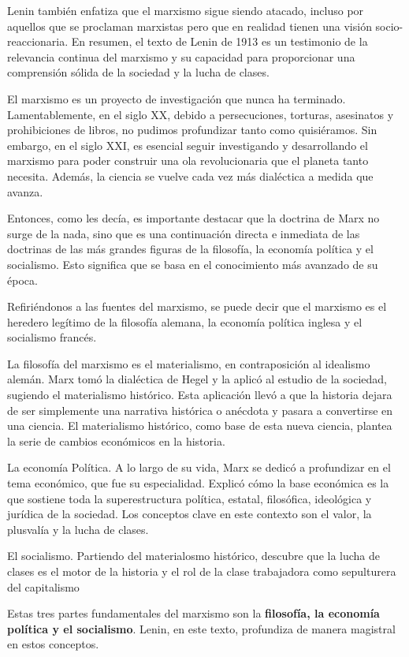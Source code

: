 \documentclass[
  a4paper,
]{article}
\begin{document}
Lenin también enfatiza que el marxismo sigue siendo atacado, incluso por
aquellos que se proclaman marxistas pero que en realidad tienen una
visión socio-reaccionaria. En resumen, el texto de Lenin de 1913 es un
testimonio de la relevancia continua del marxismo y su capacidad para
proporcionar una comprensión sólida de la sociedad y la lucha de clases.

El marxismo es un proyecto de investigación que nunca ha terminado.
Lamentablemente, en el siglo XX, debido a persecuciones, torturas,
asesinatos y prohibiciones de libros, no pudimos profundizar tanto como
quisiéramos. Sin embargo, en el siglo XXI, es esencial seguir
investigando y desarrollando el marxismo para poder construir una ola
revolucionaria que el planeta tanto necesita. Además, la ciencia se
vuelve cada vez más dialéctica a medida que avanza.

Entonces, como les decía, es importante destacar que la doctrina de Marx
no surge de la nada, sino que es una continuación directa e inmediata de
las doctrinas de las más grandes figuras de la filosofía, la economía
política y el socialismo. Esto significa que se basa en el conocimiento
más avanzado de su época.

Refiriéndonos a las fuentes del marxismo, se puede decir que el marxismo
es el heredero legítimo de la filosofía alemana, la economía política
inglesa y el socialismo francés.

La filosofía del marxismo es el materialismo, en contraposición al
idealismo alemán. Marx tomó la dialéctica de Hegel y la aplicó al
estudio de la sociedad, sugiendo el materialismo histórico. Esta
aplicación llevó a que la historia dejara de ser simplemente una
narrativa histórica o anécdota y pasara a convertirse en una ciencia. El
materialismo histórico, como base de esta nueva ciencia, plantea la
serie de cambios económicos en la historia.

La economía Política. A lo largo de su vida, Marx se dedicó a
profundizar en el tema económico, que fue su especialidad. Explicó cómo
la base económica es la que sostiene toda la superestructura política,
estatal, filosófica, ideológica y jurídica de la sociedad. Los conceptos
clave en este contexto son el valor, la plusvalía y la lucha de clases.

El socialismo. Partiendo del materialosmo histórico, descubre que la
lucha de clases es el motor de la historia y el rol de la clase
trabajadora como sepulturera del capitalismo

Estas tres partes fundamentales del marxismo son la \textbf{filosofía,
la economía política y el socialismo}. Lenin, en este texto, profundiza
de manera magistral en estos conceptos.
\end{document}
